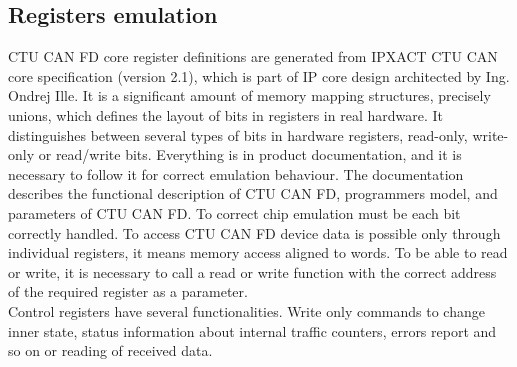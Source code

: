 \documentclass{ctuthesis}
\begin{document}
 \subsection{Registers emulation}
  CTU CAN FD core register definitions are generated from IPXACT CTU CAN core specification (version 2.1), which is part of IP core design architected by Ing. Ondrej Ille. It is a significant amount of memory mapping structures, precisely unions, which defines the layout of bits in registers in real hardware. It distinguishes between several types of bits in hardware registers, read-only, write-only or read/write bits. Everything is in product documentation, and it is necessary to follow it for correct emulation behaviour. The documentation describes the functional description of CTU CAN FD, programmers model, and parameters of CTU CAN FD. To correct chip emulation must be each bit correctly handled. To access CTU CAN FD device data is possible only through individual registers, it means memory access aligned to words. To be able to read or write, it is necessary to call a read or write function with the correct address of the required register as a parameter. \\
Control registers have several functionalities. Write only commands to change inner state, status information about internal traffic counters, errors report and so on or reading of received data.
 
\end{document}
